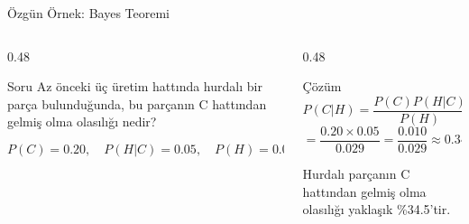 \documentclass[light]{lutbeamer}
\begin{document}
\begin{frame}{Özgün Örnek: Bayes Teoremi}
\small
\begin{columns}[T,onlytextwidth]
    \begin{column}{0.48\textwidth}
        \begin{block}{Soru}
            Az önceki üç üretim hattında hurdalı bir parça bulunduğunda, bu parçanın C hattından gelmiş olma olasılığı nedir?

            \vspace{0.15cm}
            \[
            P(C)=0.20,\quad P(H|C)=0.05,\quad P(H)=0.029
            \]
        \end{block}
    \end{column}
    \begin{column}{0.48\textwidth}
        \begin{exampleblock}{Çözüm}
            \[
            P(C|H)=\frac{P(C)P(H|C)}{P(H)}
            \]
            \[
            =\frac{0.20 \times 0.05}{0.029}
            =\frac{0.010}{0.029}\approx 0.345
            \]

            Hurdalı parçanın C hattından gelmiş olma olasılığı yaklaşık \%34.5'tir.
        \end{exampleblock}
    \end{column}
\end{columns}
\end{frame}
\end{document}
